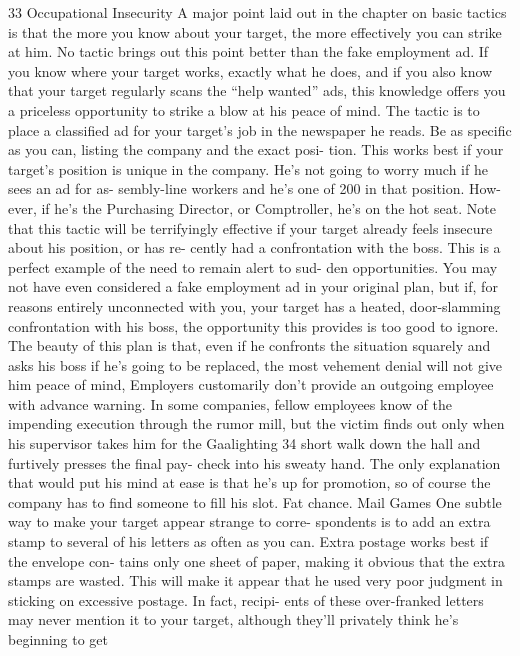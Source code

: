 \documentclass{book}
\begin{document}
33 
Occupational Insecurity 
A major point laid out in the chapter on basic tactics is that 
the more you know about your target, the more effectively you 
can strike at him. No tactic brings out this point better than the 
fake employment ad. 
If you know where your target works, exactly what he does, 
and if you also know that your target regularly scans the “help 
wanted” ads, this knowledge offers you a priceless opportunity 
to strike a blow at his peace of mind. The tactic is to place a 
classified ad for your target's job in the newspaper he reads. Be 
as specific as you can, listing the company and the exact posi- 
tion. 
This works best if your target's position is unique in the 
company. He's not going to worry much if he sees an ad for as- 
sembly-line workers and he's one of 200 in that position. How- 
ever, if he's the Purchasing Director, or Comptroller, he's on the 
hot seat. Note that this tactic will be terrifyingly effective if 
your target already feels insecure about his position, or has re- 
cently had a confrontation with the boss. 
This is a perfect example of the need to remain alert to sud- 
den opportunities. You may not have even considered a fake 
employment ad in your original plan, but if, for reasons entirely 
unconnected with you, your target has a heated, door-slamming 
confrontation with his boss, the opportunity this provides is too 
good to ignore. 
The beauty of this plan is that, even if he confronts the 
situation squarely and asks his boss if he's going to be replaced, 
the most vehement denial will not give him peace of mind, 
Employers customarily don't provide an outgoing employee 
with advance warning. In some companies, fellow employees 
know of the impending execution through the rumor mill, but 
the victim finds out only when his supervisor takes him for the  Gaalighting 
34 
short walk down the hall and furtively presses the final pay- 
check into his sweaty hand. 
The only explanation that would put his mind at ease is that 
he's up for promotion, so of course the company has to find 
someone to fill his slot. Fat chance. 
Mail Games 
One subtle way to make your target appear strange to corre- 
spondents is to add an extra stamp to several of his letters as 
often as you can. Extra postage works best if the envelope con- 
tains only one sheet of paper, making it obvious that the extra 
stamps are wasted. This will make it appear that he used very 
poor judgment in sticking on excessive postage. In fact, recipi- 
ents of these over-franked letters may never mention it to your 
target, although they'll privately think he's beginning to get 
\end{document}
